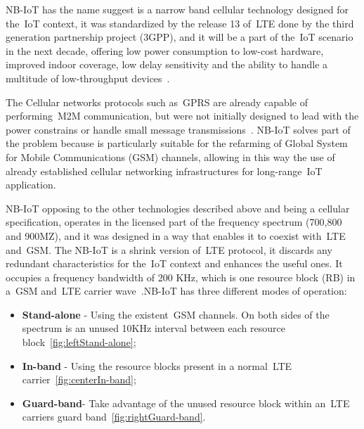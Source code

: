 NB-IoT has the name suggest is a narrow band cellular technology designed for the~\gls{IoT} context, it was standardized by the release 13 of~\gls{LTE} done by the third generation partnership project (3GPP), and it will be a part of the~\gls{IoT} scenario in the next decade, offering low power consumption to low-cost hardware, improved indoor coverage, low delay sensitivity and the ability to handle a multitude of low-throughput devices~\cite{Gozalvez2016}. 

The Cellular networks protocols such as~\gls{GPRS} are already capable of performing~\gls{M2M} communication, but were not  initially designed to lead with the power constrains or handle small message transmissions~\cite{Anteur2016}. NB-IoT solves part of the problem because is particularly suitable for the refarming of Global System for Mobile Communications (\gls{GSM}) channels, allowing in this way the use of  already established cellular networking infrastructures for long-range~\gls{IoT} application.

NB-IoT opposing to the other technologies described above and being a cellular specification, operates in the licensed part of the frequency spectrum (700,800 and 900MZ), and it was designed in a way that enables it to coexist with~\gls{LTE} and~\gls{GSM}. The NB-IoT is a shrink version of~\gls{LTE} protocol, it discards any redundant characteristics for the~\gls{IoT} context and enhances the useful ones. It occupies a frequency bandwidth of 200 KHz, which is one resource block (RB) in a~\gls{GSM} and~\gls{LTE} carrier wave~\cite{Mekki2019}.\newline NB-IoT has three different modes of operation:
\begin{itemize}
	\item \textbf{Stand-alone} - Using the existent~\gls{GSM} channels. On both sides of the spectrum is an unused 10KHz interval between each resource block~\ref{fig:leftStand-alone};
	\item\textbf{In-band} - Using the resource blocks present in a normal~\gls{LTE} carrier~\ref{fig:centerIn-band};
	\item \textbf{Guard-band}- Take advantage of the unused resource block within an~\gls{LTE} carriers guard band~\ref{fig:rightGuard-band}.

\end{itemize} 

